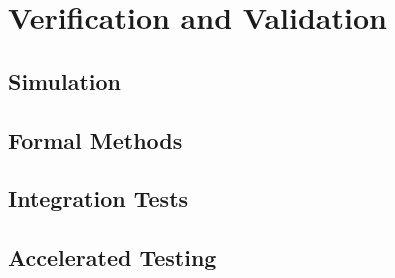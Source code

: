 \chapter{Verification and Validation}
\lipsum[1-3]
\section{Simulation}
\lipsum[1-3]
\section{Formal Methods}
\lipsum[1-3]
\section{Integration Tests}
\lipsum[1-3]
\section{Accelerated Testing}
\lipsum[1-3]